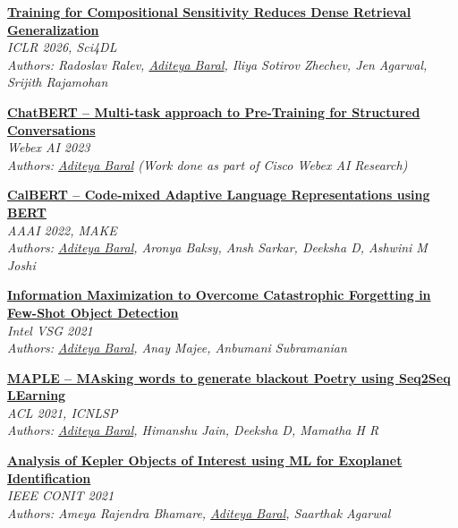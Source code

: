 \documentclass[letterpaper, 11pt]{article}
\begin{document}
	\begin{enumerate}[label={[\arabic{*}]}]
		\item \textbf{\href{https://openreview.net/forum?id=F5ueiEGP4l}{Training for
			Compositional Sensitivity Reduces Dense Retrieval Generalization}} \\
			\textit{ICLR 2026, Sci4DL} \\ \textit{Authors: Radoslav Ralev, \underline{Aditeya Baral},
			Iliya Sotirov Zhechev, Jen Agarwal, Srijith Rajamohan}

		\item \textbf{\href{https://aditeyabaral.com/publications/}{ChatBERT -- Multi-task
			approach to Pre-Training for Structured Conversations}} \\ \textit{Webex
			AI 2023} \\ \textit{Authors: \underline{Aditeya Baral} (Work done as part of
			Cisco Webex AI Research)}

		\item \textbf{\href{https://ceur-ws.org/Vol-3121/short3.pdf}{CalBERT -- Code-mixed
			Adaptive Language Representations using BERT}} \\ \textit{AAAI 2022, MAKE}
			\\ \textit{Authors: \underline{Aditeya Baral}, Aronya Baksy, Ansh Sarkar, Deeksha
			D, Ashwini M Joshi}

		\item \textbf{\href{https://aditeyabaral.com/assets/pdf/Information_Maximization_to_Overcome_Catastrophic_Forgetting_in_Few_Shot_Object_Detection.pdf}{Information
			Maximization to Overcome Catastrophic Forgetting in Few-Shot Object
			Detection}} \\ \textit{Intel VSG 2021} \\ \textit{Authors: \underline{Aditeya Baral},
			Anay Majee, Anbumani Subramanian}

		\item \textbf{\href{https://aclanthology.org/2021.icnlsp-1.6/}{MAPLE -- MAsking
			words to generate blackout Poetry using Seq2Seq LEarning}} \\ \textit{ACL
			2021, ICNLSP} \\ \textit{Authors: \underline{Aditeya Baral}, Himanshu Jain,
			Deeksha D, Mamatha H R}

		\item \textbf{\href{https://ieeexplore.ieee.org/document/9498407}{Analysis
			of Kepler Objects of Interest using ML for Exoplanet Identification}} \\
			\textit{IEEE CONIT 2021} \\ \textit{Authors: Ameya Rajendra Bhamare,
			\underline{Aditeya Baral}, Saarthak Agarwal}
	\end{enumerate}
\end{document}
